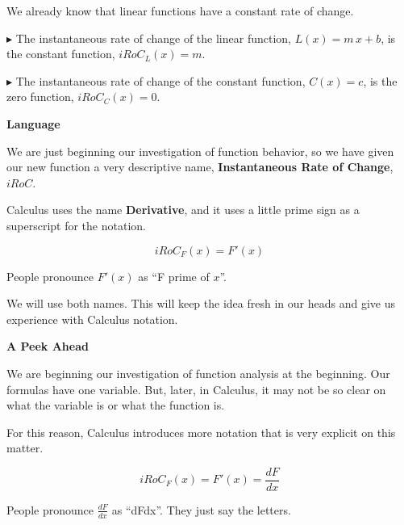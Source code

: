 \documentclass{ximera}
\begin{document}
We already know that linear functions have a constant rate of change.


\textbf{\textcolor{red!70!darkgray}{$\blacktriangleright$}} The instantaneous rate of change of the linear function, $L(x) = m \, x + b$, is the constant function, $iRoC_L(x) = m$. 



\textbf{\textcolor{red!70!darkgray}{$\blacktriangleright$}} The instantaneous rate of change of the constant function, $C(x) = c$, is the zero function, $iRoC_C(x) = 0$. 





\begin{notation} \textbf{\textcolor{red!50!green}{Language}} 


We are just beginning our investigation of function behavior, so we have given our new function a very descriptive name, \textbf{\textcolor{red!50!green}{Instantaneous Rate of Change}},  \textbf{\textcolor{red!50!green}{$iRoC$}}. 


Calculus uses the name \textbf{\textcolor{red!50!green}{Derivative}}, and it uses a little prime sign as a superscript for the notation.



\[
iRoC_F(x) = F'(x)
\]


People pronounce $F'(x)$ as ``F prime of $x$''.


\end{notation}

We will use both names.  This will keep the idea fresh in our heads and  give us experience with Calculus notation.






\begin{notation} \textbf{\textcolor{red!50!green}{A Peek Ahead}}


We are beginning our investigation of function analysis at the beginning.  Our formulas have one variable.  But, later, in Calculus, it may not be so clear on what the variable is or what the function is. 

For this reason, Calculus introduces more notation that is very explicit on this matter.



\[
iRoC_F(x) = F'(x) = \frac{dF}{dx}
\]


People pronounce $\frac{dF}{dx}$ as ``dFdx''.  They just say the letters.


\end{notation}
\end{document}
